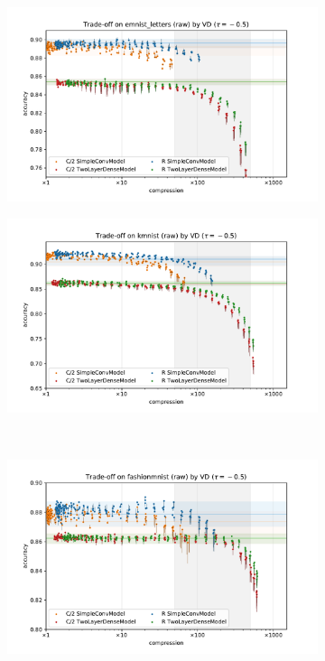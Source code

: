 \documentclass[a4paper,10pt]{article}
\begin{document}
\begin{figure}[b]
  \centering
  \begin{subfigure}[b]{0.5\textwidth}
    \centering
    \includegraphics[width=\linewidth]{figure__mnist-like__trade-off/appendix__cmp__VD__emnist_letters__raw__-0.5.pdf}
  \end{subfigure}%
  \begin{subfigure}[b]{0.5\textwidth}
    \centering
    \includegraphics[width=\linewidth]{figure__mnist-like__trade-off/appendix__cmp__VD__kmnist__raw__-0.5.pdf}
  \end{subfigure} \\%
  \begin{subfigure}[b]{0.5\textwidth}
    \centering
    \includegraphics[width=\linewidth]{figure__mnist-like__trade-off/appendix__cmp__VD__fashionmnist__raw__-0.5.pdf}

\end{subfigure}
\end{figure}
\end{document}

